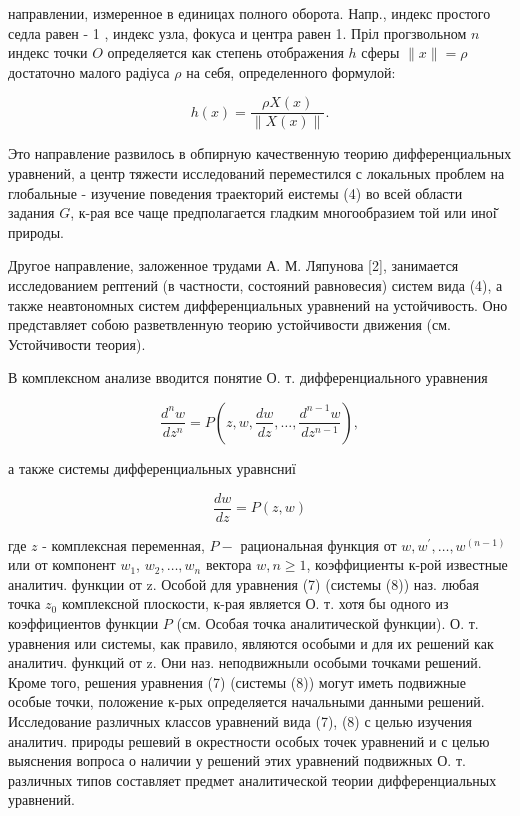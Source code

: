 \documentclass[10pt]{article}
\begin{document}
направлении, измеренное в единицах полного оборота. Напр., индекс простого седла равен - 1 , индекс узла, фокуса и центра равен 1. Пріл прогзвольном $n$ индекс точки $O$ определяется как степень отображения $h$ сферы $\|x\|=\rho$ достаточно малого радіуса $\rho$ на себя, определенного формулой:



\[

h(x)=\frac{\rho X(x)}{\|X(x)\|} .

\]



Это направление развилось в обпирную качественную теорию дифференциальных уравнений, а центр тяжести исследований переместился с локальных проблем на глобальные - изучение поведения траекторий еистемы (4) во всей области задания $G$, к-рая все чаще предполагается гладким многообразием той или иноі̆ природы.



Другое направление, заложенное трудами А. М. Ляпунова [2], занимается исследованием рептений (в частности, состояний равновесия) систем вида (4), а также неавтономных систем дифференциальных уравнений на устойчивость. Оно представляет собою разветвленную теорию устойчивости движения (см. Устойчивости теория).



В комплексном анализе вводится понятие О. т. дифференциального уравнения



\[

\frac{d^{n} w}{d z^{n}}=P\left(z, w, \frac{d w}{d z}, \ldots, \frac{d^{n-1} w}{d z^{n-1}}\right),

\]



а также системы дифференциальных уравнсниї



\[

\frac{d w}{d z}=P(z, w)

\]



где $z$ - комплексная переменная, $P-$ рациональная функция от $w, w^{\prime}, \ldots, w^{(n-1)}$ или от компонент $w_{1}$, $w_{2}, \ldots, w_{n}$ вектора $w, n \geqslant 1$, коэффициенты к-рой известные аналитич. функции от z. Особой для уравнения (7) (системы (8)) наз. любая точка $z_{0}$ комплексной плоскости, к-рая является О. т. хотя бы одного из коэффициентов функции $P$ (см. Особая точка аналитической функции). О. т. уравнения или системы, как правило, являются особыми и для их решений как аналитич. функций от z. Они наз. неподвижныли особыми точками решений. Кроме того, решения уравнения (7) (системы (8)) могут иметь подвижные особые точки, положение к-рых определяется начальными данными решений. Исследование различных классов уравнений вида (7), (8) с целью изучения аналитич. природы решевий в окрестности особых точек уравнений и с целью выяснения вопроса о наличии у решений этих уравнений подвижных О. т. различных типов составляет предмет аналитической теории дифференциальных уравнений.
\end{document}
